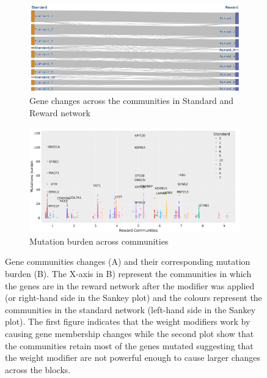\begin{figure}[!htb]
    \centering
    \begin{subfigure}[!t]{1.0\textwidth}
        \includegraphics[width=\textwidth,keepaspectratio]{Sections/Network_I/Resources/P0/Comms/Sky_Comm_Comp_4K_v3.png}
        \caption{Gene changes across the communities in Standard and Reward network}
        \label{fig:N_I:p0_chg_sankey}
    \end{subfigure}
    \begin{subfigure}[!t]{1.0\textwidth}
        \includegraphics[width=\textwidth,keepaspectratio]{Sections/Network_I/Resources/P0/Comms/Mut_Comm_Comp_4K_v3.png}
        \caption{Mutation burden across communities}
        \label{fig:N_I:p0_chg_mut}
    \end{subfigure}
    \caption{Gene communities changes (A) and their corresponding mutation burden (B). The X-axis in B) represent the communities in which the genes are in the reward network after the modifier was applied (or right-hand side in the Sankey plot) and the colours represent the communities in the standard network (left-hand side in the Sankey plot). The first figure indicates that the weight modifiers work by causing gene membership changes while the second plot show that the communities retain most of the genes mutated suggesting that the weight modifier are not powerful enough to cause larger changes across the blocks. }
    \label{fig:N_I:p0_comm_chgs_1}
\end{figure}




